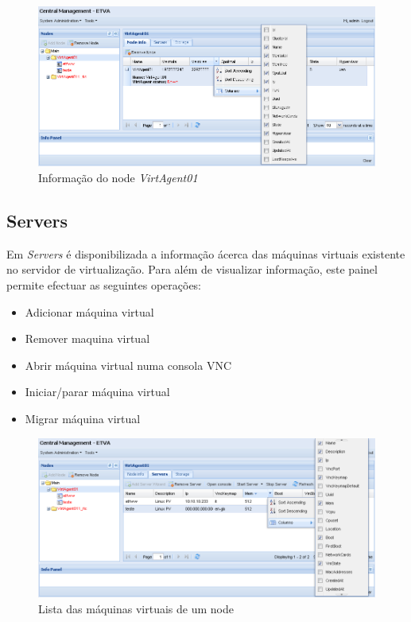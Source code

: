 \begin{figure}[H]
	\begin{center}
	\includegraphics[scale=0.5]{screenshots/node_info.png}
	\caption{Informação do node \emph{VirtAgent01}}
	\label{fig:node_info}
	\end{center}
\end{figure}

\subsection{Servers}
\label{sec:servers}
Em \emph{Servers} é disponibilizada a informação ácerca das máquinas virtuais existente no servidor de virtualização. Para além de visualizar informação, este painel permite efectuar as seguintes operações:
\begin{itemize}
	\item Adicionar máquina virtual
	\item Remover maquina virtual
	\item Abrir máquina virtual numa consola VNC
	\item Iniciar/parar máquina virtual
    \item Migrar máquina virtual
\end{itemize}
\begin{figure}[H]
	\begin{center}
	\includegraphics[scale=0.5]{screenshots/node_servers.png}
	\caption{Lista das máquinas virtuais de um node}
	\label{fig:node_servers}
	\end{center}
\end{figure}

